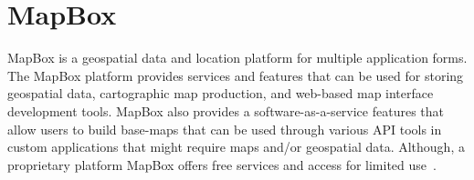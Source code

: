 \section{MapBox}

MapBox is a geospatial data and location platform for multiple application
forms.  The MapBox platform provides services and features that can be used for
storing geospatial data, cartographic map production, and web-based map
interface development tools.  MapBox also provides a software-as-a-service
features that allow users to build base-maps that can be used through various
API tools in custom applications that might require maps and/or geospatial
data.  Although, a proprietary platform MapBox offers free services and access
for limited use~\cite{hid-sp18-505-MapBox2018}.
